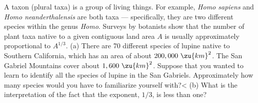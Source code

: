 A taxon (plural taxa) is a group of living things. For example, \emph{Homo sapiens} and
\emph{Homo neanderthalensis} are both taxa --- specifically, they are two different species within
the genus \emph{Homo}. Surveys by botanists show that the number of plant taxa native to
a given contiguous land area $A$ is usually approximately proportional to $A^{1/3}$. (a) There are 70
different species of lupine native to Southern California, which has an area of about
$200,000\ \zu{km}^2$. The San Gabriel Mountains cover about $1,600\ \zu{km}^2$. Suppose
that you wanted to learn to identify all the species of lupine in the San Gabriels.
Approximately how many species would you have to familiarize yourself with?<%
(b) What is the interpretation of the fact that the exponent, $1/3$, is less than one?
